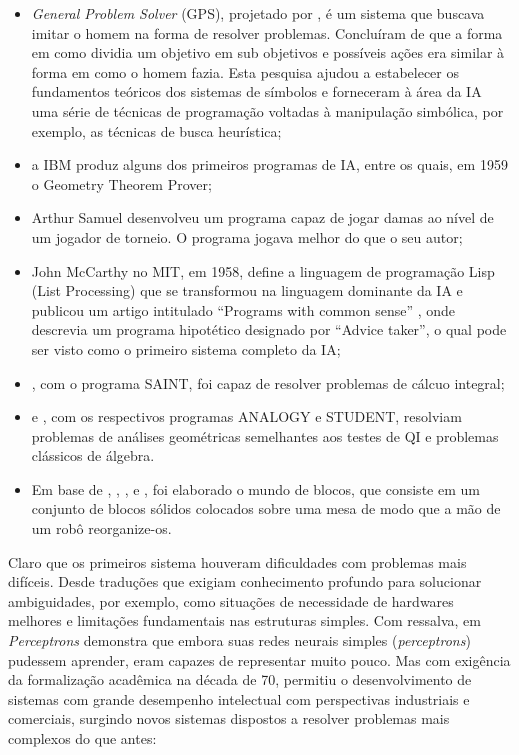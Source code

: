 \documentclass[
]{book}
\begin{document}
\begin{itemize}
\item
  \emph{General Problem Solver} (GPS), projetado por \citet{newell1959variety}, é um sistema que buscava imitar o homem na forma de resolver problemas. Concluíram de que a forma em como dividia um objetivo em sub objetivos e possíveis ações era similar à forma em como o homem fazia. Esta pesquisa ajudou a estabelecer os fundamentos teóricos dos sistemas de símbolos e forneceram à área da IA uma série de técnicas de programação voltadas à manipulação simbólica, por exemplo, as técnicas de busca heurística;
\item
  a IBM produz alguns dos primeiros programas de IA, entre os quais, em 1959 o
  Geometry Theorem Prover;
\item
  Arthur Samuel desenvolveu um programa capaz de jogar damas ao nível de um
  jogador de torneio. O programa jogava melhor do que o seu autor;
\item
  John McCarthy no MIT, em 1958, define a linguagem de programação Lisp (List Processing) que se transformou na linguagem dominante
  da IA e publicou um artigo intitulado ``Programs with common sense'' \citep{mccarthy1968programs},
  onde descrevia um programa hipotético designado por ``Advice taker'', o qual pode
  ser visto como o primeiro sistema completo da IA;
\item
  \citet{slagle1963heuristic}, com o programa SAINT, foi capaz de resolver problemas de cálcuo integral;
\item
  \citet{evans1964program} e \citet{bobrow1967problems}, com os respectivos programas ANALOGY e STUDENT, resolviam problemas de análises geométricas semelhantes aos testes de QI e problemas clássicos de álgebra.
\item
  Em base de \citet{huffman1971impossible}, \citet{waltz1975understanding}, \citet{winograd1972understanding}, \citet{winston1970learning} e \citet{fahlman1974planning}, foi elaborado o mundo de blocos, que consiste em um conjunto de blocos sólidos colocados sobre uma mesa de modo que a mão de um robô reorganize-os.
\end{itemize}

Claro que os primeiros sistema houveram dificuldades com problemas mais difíceis. Desde traduções que exigiam conhecimento profundo para solucionar ambiguidades, por exemplo, como situações de necessidade de hardwares melhores e limitações fundamentais nas estruturas simples. Com ressalva, em \emph{Perceptrons} \citep{minsky1969perceptrons} demonstra que embora suas redes neurais simples (\emph{perceptrons}) pudessem aprender, eram capazes de representar muito pouco. Mas com exigência da formalização acadêmica na década de 70, permitiu o desenvolvimento de sistemas com grande desempenho intelectual com perspectivas industriais e comerciais, surgindo novos sistemas dispostos a resolver problemas mais complexos do que antes:
\end{document}
